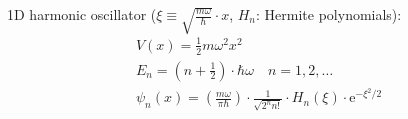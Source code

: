 \documentclass[fontsize=11pt,a4paper]{scrartcl}
\begin{document}
1D harmonic oscillator ($\xi\equiv\sqrt{\frac{m\omega}{\hbar}}\cdot x$, $H_n$: Hermite polynomials):
\begin{gather*}
	V(x) = \frac{1}{2} m\omega^2 x^2\\
	E_n = \left(n+\frac{1}{2}\right)\cdot\hbar\omega\quad n=1,2,\dots\\
	\psi_n(x) = \left(\frac{m\omega}{\pi\hbar}\right)\cdot\frac{1}{\sqrt{2^n n!}}\cdot
		H_n(\xi)\cdot\mathrm{e}^{-\xi^2/2}
\end{gather*}

\end{document}
